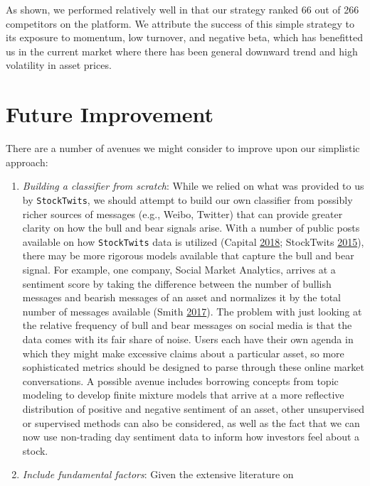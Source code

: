 \documentclass[11pt,]{article}
\begin{document}
As shown, we performed relatively well in that our strategy ranked 66
out of 266 competitors on the platform. We attribute the success of this
simple strategy to its exposure to momentum, low turnover, and negative
beta, which has benefitted us in the current market where there has been
general downward trend and high volatility in asset prices.

\section{Future Improvement}\label{future-improvement}

There are a number of avenues we might consider to improve upon our
simplistic approach:

\begin{enumerate}
\def\labelenumi{\arabic{enumi}.}
\item
  \emph{Building a classifier from scratch}: While we relied on what was
  provided to us by \texttt{StockTwits}, we should attempt to build our
  own classifier from possibly richer sources of messages (e.g., Weibo,
  Twitter) that can provide greater clarity on how the bull and bear
  signals arise. With a number of public posts available on how
  \texttt{StockTwits} data is utilized (Capital
  \protect\hyperlink{ref-Nairu2018}{2018}; StockTwits
  \protect\hyperlink{ref-Stocktwits2015}{2015}), there may be more
  rigorous models available that capture the bull and bear signal. For
  example, one company, Social Market Analytics, arrives at a sentiment
  score by taking the difference between the number of bullish messages
  and bearish messages of an asset and normalizes it by the total number
  of messages available (Smith \protect\hyperlink{ref-Smith2018}{2017}).
  The problem with just looking at the relative frequency of bull and
  bear messages on social media is that the data comes with its fair
  share of noise. Users each have their own agenda in which they might
  make excessive claims about a particular asset, so more sophisticated
  metrics should be designed to parse through these online market
  conversations. A possible avenue includes borrowing concepts from
  topic modeling to develop finite mixture models that arrive at a more
  reflective distribution of positive and negative sentiment of an
  asset, other unsupervised or supervised methods can also be
  considered, as well as the fact that we can now use non-trading day
  sentiment data to inform how investors feel about a stock.
\item
  \emph{Include fundamental factors}: Given the extensive literature on

\end{enumerate}
\end{document}
